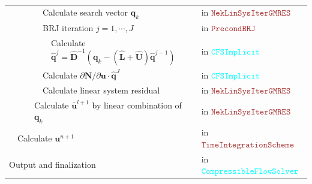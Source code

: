 \begin {table}[htbp!]
\begin{tabular}{|l|l|l|l|l|l||ll||l||l||l||l||l|}
     &  &  & \multirow{5}{*}{} & \multicolumn{3}{l}{Calculate search vector $\mathbf{q}_{k}$} & \multicolumn{6}{l|}{{\footnotesize{}in }\textcolor{brown}{\footnotesize{}$\texttt{NekLinSysIterGMRES}$}}\tabularnewline
    \cline{5-13} \cline{6-13} \cline{7-13} \cline{8-13} \cline{9-13} \cline{10-13} \cline{11-13} \cline{12-13} \cline{13-13} 
     &  &  &  & \multicolumn{3}{l}{BRJ iteration $j=1,\cdots,J$ } & \multicolumn{6}{l|}{{\footnotesize{}in }\textcolor{brown}{\footnotesize{}$\texttt{PrecondBRJ}$}}\tabularnewline
    \cline{6-13} \cline{7-13} \cline{8-13} \cline{9-13} \cline{10-13} \cline{11-13} \cline{12-13} \cline{13-13} 
     &  &  &  &  & \multicolumn{2}{l}{Calculate {\small{}$\hat{\mathbf{q}}^{j}=\hat{\mathbf{D}}^{-1}\left(\mathbf{q}_{k}-\left(\mathbf{\hat{L}}+\hat{\mathbf{U}}\right)\hat{\mathbf{q}}^{j-1}\right)$}} & \multicolumn{6}{l|}{{\footnotesize{}in }\textcolor{cyan}{\footnotesize{}$\texttt{CFSImplicit}$}}\tabularnewline
    \cline{5-13} \cline{6-13} \cline{7-13} \cline{8-13} \cline{9-13} \cline{10-13} \cline{11-13} \cline{12-13} \cline{13-13} 
     &  &  &  & \multicolumn{3}{l}{Calculate $\partial\mathbf{N}/\partial\mathbf{u}\cdot\hat{\mathbf{q}}^{J}$} & \multicolumn{6}{l|}{{\footnotesize{}in }\textcolor{cyan}{\footnotesize{}$\texttt{CFSImplicit}$}}\tabularnewline
    \cline{5-13} \cline{6-13} \cline{7-13} \cline{8-13} \cline{9-13} \cline{10-13} \cline{11-13} \cline{12-13} \cline{13-13} 
     &  &  &  & \multicolumn{3}{l}{Calculate linear system residual} & \multicolumn{6}{l|}{{\footnotesize{}in }\textcolor{brown}{\footnotesize{}$\texttt{NekLinSysIterGMRES}$}}\tabularnewline
    \cline{4-13} \cline{5-13} \cline{6-13} \cline{7-13} \cline{8-13} \cline{9-13} \cline{10-13} \cline{11-13} \cline{12-13} \cline{13-13} 
     &  &  & \multicolumn{4}{l}{Calculate $\bar{\mathbf{u}}^{l+1}$ by linear combination of $\mathbf{q}_{k}$} & \multicolumn{6}{l|}{{\footnotesize{}in }\textcolor{brown}{\footnotesize{}$\texttt{NekLinSysIterGMRES}$}}\tabularnewline
    \cline{2-13} \cline{3-13} \cline{4-13} \cline{5-13} \cline{6-13} \cline{7-13} \cline{8-13} \cline{9-13} \cline{10-13} \cline{11-13} \cline{12-13} \cline{13-13} 
     & \multicolumn{6}{l}{Calculate $\mathbf{u}^{n+1}$} & \multicolumn{6}{l|}{{\footnotesize{}in }\textcolor{brown}{\footnotesize{}$\texttt{TimeIntegrationScheme}$}}\tabularnewline
    \hline 
    \multicolumn{7}{|l}{Output and finalization} & \multicolumn{6}{l|}{{\footnotesize{}in }\textcolor{cyan}{\footnotesize{}$\texttt{CompressibleFlowSolver}$}}\tabularnewline
    \hline 
    \end{tabular}
  \end{table}

